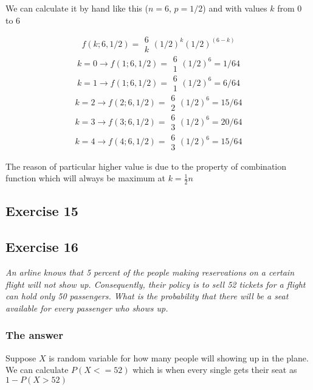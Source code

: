 \documentclass[12pt,a4paper]{article}
\begin{document}
We can calculate it by hand like this ($n=6$, $p=1/2$) and with values $k$ from 0 to 6

\[
f(k; 6, 1/2) = \begin{array}{c}6\\k\end{array}(1/2)^k (1/2)^{(6-k)}
\]
\[ k=0 \to f(1;6,1/2) = \begin{array}{c}6\\1\end{array}(1/2)^6 = 1/64 \]
\[ k=1 \to f(1;6,1/2) = \begin{array}{c}6\\1\end{array}(1/2)^6 = 6/64 \]
\[ k=2 \to f(2;6,1/2) = \begin{array}{c}6\\2\end{array}(1/2)^6 = 15/64 \]
\[ k=3 \to f(3;6,1/2) = \begin{array}{c}6\\3\end{array}(1/2)^6 = 20/64 \]
\[ k=4 \to f(4;6,1/2) = \begin{array}{c}6\\3\end{array}(1/2)^6 = 15/64 \]

The reason of particular higher value is due to the property of combination function which will always be maximum at $k = \frac{1}{2}n$

\subsection{Exercise 15}


\subsection{Exercise 16}

\textit{An arline knows that 5 percent of the people making reservations on a certain flight will not show up. Consequently, their policy is to sell 52 tickets for a flight can hold only 50 passengers. What is the probability that there will be a seat available for every passenger who shows up.}

\subsubsection{The answer}

Suppose $X$ is random variable for how many people will showing up in the plane. We can calculate $P(X<=52)$ which is when every single gets their seat as $1 - P(X>52)$

\end{document}
